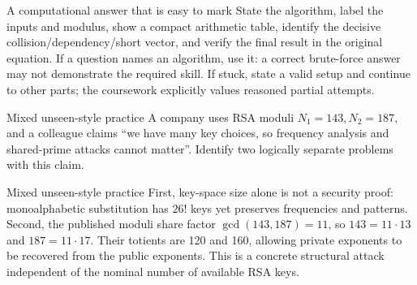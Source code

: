 \documentclass[11pt,a4paper]{article}
\begin{document}
\begin{tip}{A computational answer that is easy to mark}
State the algorithm, label the inputs and modulus, show a compact arithmetic table, identify the decisive collision/dependency/short vector, and verify the final result in the original equation. If a question names an algorithm, use it: a correct brute-force answer may not demonstrate the required skill. If stuck, state a valid setup and continue to other parts; the coursework explicitly values reasoned partial attempts.
\end{tip}
\begin{question}{Mixed unseen-style practice}
A company uses RSA moduli \(N_1=143,N_2=187\), and a colleague claims ``we have many key choices, so frequency analysis and shared-prime attacks cannot matter''. Identify two logically separate problems with this claim.
\end{question}
\begin{answer}{Mixed unseen-style practice}
First, key-space size alone is not a security proof: monoalphabetic substitution has \(26!\) keys yet preserves frequencies and patterns. Second, the published moduli share factor \(\gcd(143,187)=11\), so \(143=11\cdot13\) and \(187=11\cdot17\). Their totients are 120 and 160, allowing private exponents to be recovered from the public exponents. This is a concrete structural attack independent of the nominal number of available RSA keys.
\end{answer}
\end{document}
